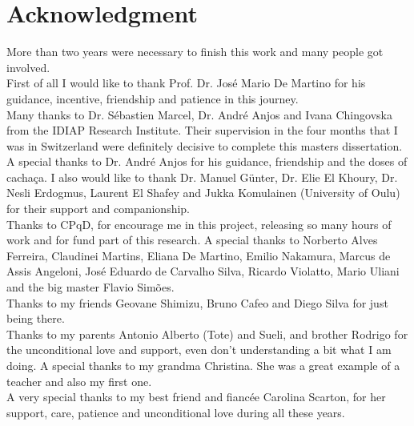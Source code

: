 \chapter*{Acknowledgment}


\noindent More than two years were necessary to finish this work and many people got involved. \\

First of all I would like to thank Prof. Dr. Jos\'e Mario De Martino for his guidance, incentive, friendship and patience in this journey. \\

Many thanks to Dr. S\'ebastien Marcel, Dr. Andr\'e Anjos and Ivana Chingovska from the IDIAP Research Institute. Their supervision in the four months that I was in Switzerland were definitely decisive to complete this masters dissertation. A special thanks to Dr. Andr\'e Anjos for his guidance, friendship and the doses of cacha\c{c}a. I also would like to thank Dr. Manuel G{\"u}nter, Dr. Elie El Khoury, Dr. Nesli Erdogmus, Laurent El Shafey and Jukka Komulainen (University of Oulu) for their support and companionship. \\

Thanks to CPqD, for encourage me in this project, releasing so many hours of work and for fund part of this research. A special thanks to Norberto Alves Ferreira, Claudinei Martins, Eliana De Martino, Emilio Nakamura, Marcus de Assis Angeloni, Jos\'e Eduardo de Carvalho Silva, Ricardo Violatto, Mario Uliani and the big master Flavio Sim\~oes. \\

Thanks to my friends Geovane Shimizu, Bruno Cafeo and Diego Silva for just being there. \\

Thanks to my parents Antonio Alberto (Tote) and Sueli, and brother Rodrigo for the unconditional love and support, even don't understanding a bit what I am doing. A special thanks to my grandma Christina. She was a great example of a teacher and also my first one. \\

A very special thanks to my best friend and fianc\'ee Carolina Scarton, for her support, care, patience and unconditional love during all these years.


\newpage %

\null

